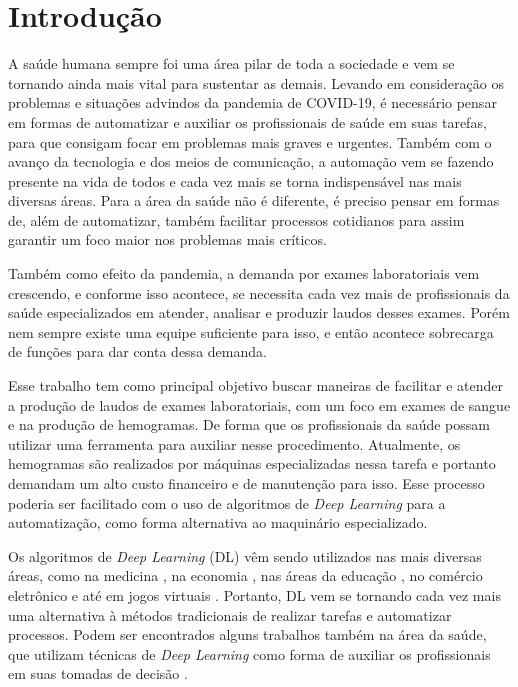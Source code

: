 \chapter{Introdução}
\label{chap:introducao}

A saúde humana sempre foi uma área pilar de toda a sociedade e vem se tornando ainda mais vital para sustentar as demais. Levando em consideração os problemas e situações advindos da pandemia de COVID-19, é necessário pensar em formas de automatizar e auxiliar os profissionais de saúde em suas tarefas, para que consigam focar em problemas mais graves e urgentes. Também com o avanço da tecnologia e dos meios de comunicação, a automação vem se fazendo presente na vida de todos e cada vez mais se torna indispensável nas mais diversas áreas. Para a área da saúde não é diferente, é preciso pensar em formas de, além de automatizar, também facilitar processos cotidianos para assim garantir um foco maior nos problemas mais críticos.

Também como efeito da pandemia, a demanda por exames laboratoriais vem crescendo, e conforme isso acontece, se necessita cada vez mais de profissionais da saúde especializados em atender, analisar e produzir laudos desses exames. Porém nem sempre existe uma equipe suficiente para isso, e então acontece sobrecarga de funções para dar conta dessa demanda.

Esse trabalho tem como principal objetivo buscar maneiras de facilitar e atender a produção de laudos de exames laboratoriais, com um foco em exames de sangue e na produção de hemogramas. De forma que os profissionais da saúde possam utilizar uma ferramenta para auxiliar nesse procedimento. Atualmente, os hemogramas são realizados por máquinas especializadas nessa tarefa e portanto demandam um alto custo financeiro e de manutenção para isso. Esse processo poderia ser facilitado com o uso de algoritmos de \emph{Deep Learning} para a automatização, como forma alternativa ao maquinário especializado.

Os algoritmos de \emph{Deep Learning} (DL) vêm sendo utilizados nas mais diversas áreas, como na medicina \cite{deepMedicine}, na economia \cite{deepEconomy}, nas áreas da educação \cite{deepEducation}, no comércio eletrônico \cite{deepEcommerce} e até em jogos virtuais \cite{deepGaming}. Portanto, DL vem se tornando cada vez mais uma alternativa à métodos tradicionais de realizar tarefas e automatizar processos. Podem ser encontrados alguns trabalhos também na área da saúde, que utilizam técnicas de \emph{Deep Learning} como forma de auxiliar os profissionais em suas tomadas de decisão \cite{deepHealth1} \cite{deepHealth2}.

